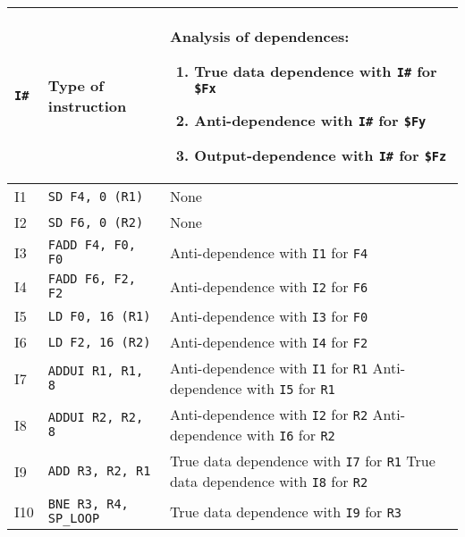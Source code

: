 \begin{table}[!htp]
    \centering
    \begin{tabular}{@{} l | l | p{20em} @{}}
        \toprule
        \texttt{I\#} & \textbf{Type of instruction}   & \textbf{Analysis of dependences:} \begin{enumerate}
            \item True data dependence with \texttt{I\#} for \texttt{\$Fx}
            \item Anti-dependence with \texttt{I\#} for \texttt{\$Fy}
            \item Output-dependence with \texttt{I\#} for \texttt{\$Fz}
        \end{enumerate} \\
        \midrule
        I1  & \texttt{SD F4, 0 (R1)} & None \\ [.3em]
        I2  & \texttt{SD F6, 0 (R2)} & None \\ [.3em]
        I3  & \texttt{FADD F4, F0, F0} & Anti-dependence with \texttt{I1} for \texttt{F4} \\ [.3em]
        I4  & \texttt{FADD F6, F2, F2} & Anti-dependence with \texttt{I2} for \texttt{F6} \\ [.3em]
        I5  & \texttt{LD F0, 16 (R1)} & Anti-dependence with \texttt{I3} for \texttt{F0} \\ [.3em]
        I6  & \texttt{LD F2, 16 (R2)} & Anti-dependence with \texttt{I4} for \texttt{F2} \\ [.3em]
        I7  & \texttt{ADDUI R1, R1, 8} & Anti-dependence with \texttt{I1} for \texttt{R1} \newline Anti-dependence with \texttt{I5} for \texttt{R1} \\ [.3em]
        I8  & \texttt{ADDUI R2, R2, 8} & Anti-dependence with \texttt{I2} for \texttt{R2} \newline Anti-dependence with \texttt{I6} for \texttt{R2} \\ [.3em]
        I9  & \texttt{ADD R3, R2, R1} & True data dependence with \texttt{I7} for \texttt{R1} \newline True data dependence with \texttt{I8} for \texttt{R2} \\ [.3em]
        I10 & \texttt{BNE R3, R4, SP\_LOOP} & True data dependence with \texttt{I9} for \texttt{R3} \\
        \bottomrule
    \end{tabular}
\end{table}

\newpage

